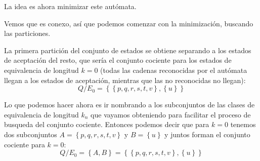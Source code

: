 \documentclass[12pt]{article}
\begin{document}
La idea es ahora minimizar este autómata.

Vemos que es conexo, así que podemos comenzar con la minimización, buscando las particiones.

La primera partición del conjunto de estados se obtiene separando a los estados de aceptación del resto, que sería el conjunto cociente para los estados de equivalencia de longitud $ k=0 $ (todas las cadenas reconocidas por el autómata llegan a los estados de aceptación, mientras que las no reconocidas no llegan):
\[
Q/E_{0} = \left\{\left\{p,q,r,s,t,v\right\},\left\{u\right\}\right\}
\]

Lo que podemos hacer ahora es ir nombrando a los subconjuntos de las clases de equivalencia de longitud $ k_{n} $ que vayamos obteniendo para facilitar el proceso de busqueda del conjunto cociente. Entonces podemos decir que para $ k=0 $ tenemos dos subconjuntos $ A=\left\{p,q,r,s,t,v\right\} $ y $ B=\left\{u\right\} $ y juntos forman el conjunto cociente para $ k=0 $: 
\[
Q/E_{0}=\left\{A, B\right\} = \left\{\left\{p,q,r,s,t,v\right\},\left\{u\right\}\right\}
\]
\end{document}
